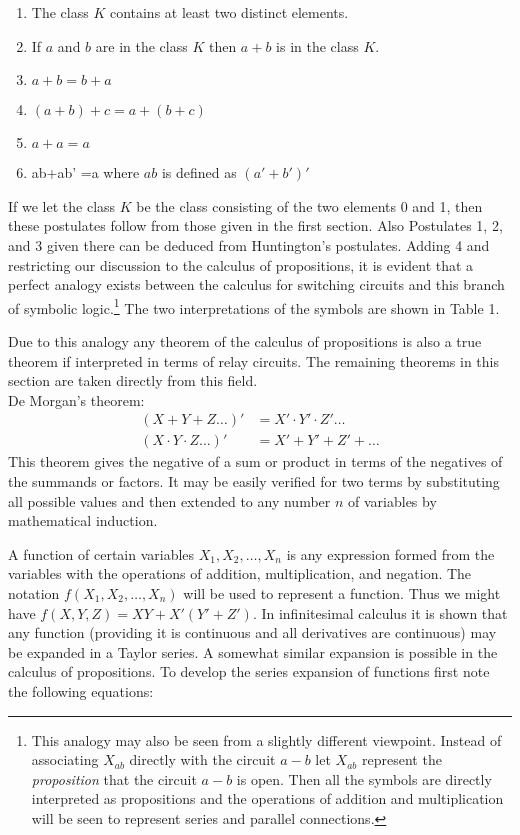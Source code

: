 \documentclass[12pt,oneside,letterpaper]{scrbook}
\begin{document}
		\begin{enumerate}
			\item The class $K$ contains at least two distinct elements.
			\item If $a$ and $b$ are in the class $K$ then $a + b$ is in the class $K$.
			\item $a + b = b + a$
			\item $(a+b)+ c=a+(b+ c)$
			\item $a+a=a$
			\item ab+ab' =a where $ab$ is defined as $(a' +b')'$
		\end{enumerate}

		If we let the class $K$ be the class consisting of the two elements 0 and 1, then these postulates follow from those given in the first section. Also Postulates 1, 2, and 3 given there can be deduced from Huntington's postulates. Adding 4 and restricting our discussion to the calculus of propositions, it is evident that a perfect analogy exists between the calculus for switching circuits and this branch of symbolic logic.\footnote{This analogy may also be seen from a slightly different viewpoint. Instead of associating $X_{ab}$ directly with the circuit $a-b$ let $X_{ab}$ represent the \textit{proposition} that the circuit $a -b$ is open. Then all the symbols are directly interpreted as propositions and the operations of addition and multiplication will be seen to represent series and parallel connections.} The two interpretations of the symbols are shown in Table 1.

		Due to this analogy any theorem of the calculus of propositions is also a true theorem if interpreted in terms of relay circuits. The remaining theorems in this section are taken directly from this field.
		\\
		
		De Morgan's theorem:
		\begin{subequations}
			\begin{align}
				(X+ Y+Z \ldots)' &=X'\cdot Y'\cdot Z'\ldots  \\
				(X\cdot Y \cdot Z\ldots)' &=X' + Y' +Z'+\ldots
			\end{align}
		\end{subequations}
		This theorem gives the negative of a sum or product in terms of the negatives of the summands or factors. It may be easily verified for two terms by substituting all possible values and then extended to any number $n$ of variables by mathematical induction.

		A function of certain variables $X_1, X_2, \ldots, X_n$ is any expression formed from the variables with the operations of addition, multiplication, and negation. The notation $f(X_1, X_2, \ldots, X_n)$ will be used to represent a function. Thus we might have $f(X, Y, Z) =XY + X' (Y' + Z')$. In infinitesimal calculus it is shown that any function (providing it is continuous and all derivatives are continuous) may be expanded in a Taylor series. A somewhat similar expansion is possible in the calculus of propositions. To develop the series expansion of functions first note the following equations:
\end{document}
